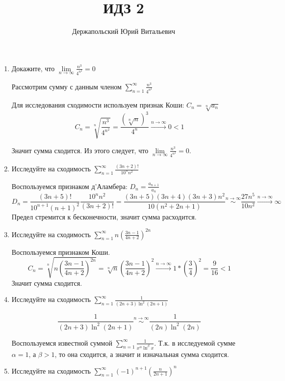 \documentclass[10pt]{article} %
\title{ИДЗ 2}
\author{Держапольский Юрий Витальевич}
\date{} %
\begin{document}
 \begin{large}  
\maketitle


\begin{enumerate}
 \item Докажите, что $ \lim\limits_{n\to\infty}{\frac{n^3}{4^{n^2}}} = 0 $

Рассмотрим сумму с данным членом $ \sum\limits_{n=1}^{\infty}{\frac{n^3}{4^{n^2}}}$

Для исследования сходимости используем признак Коши: $ C_{n} = \sqrt[n]{a_{n}}  $
\[ C_{n} = \sqrt[n]{\frac{n^3}{4^{n^2}}} = \frac{ (\sqrt[n]n)^3}{4^n} \xrightarrow{n\to\infty} 0 < 1 \]

Значит сумма сходится. Из этого следует, что $ \lim\limits_{n\to\infty}{\frac{n^3}{4^{n^2}}} = 0 $.

\item Исследуйте на сходимость $ \sum\limits_{n=1}^{\infty}{\frac{(3n+2)!}{10^n n^2}}$

Воспользуемся признаком д'Аламбера: $ D_{n} = \frac{a_{n+1}}{a_{n}}  $
\[  D_{n} =  \frac{(3n+5)!}{10^{n+1} (n+1)^2} \frac{10^n n^2}{(3n+2)!} = \frac{(3n+5)(3n+4)(3n+3)n^2}{10(n^2 + 2n+1) } \stackrel{n\to\infty}{\sim} 
\frac{27 n^5}{10 n^2 } \xrightarrow{n\to\infty} \infty \]
Предел стремится к бесконечности, значит сумма расходится.

\item Исследуйте на сходимость $ \sum\limits_{n=1}^{\infty}{n \left( \frac{3n-1}{4n+2} \right)^{2n} }$

Воспользуемся признаком Коши.
\[ C_{n} = \sqrt[n]{n \left( \frac{3n-1}{4n+2} \right)^{2n}} = \sqrt[n]{n}  \left( \frac{3n-1}{4n+2} \right)^2  \xrightarrow{n\to\infty} 1 * \left( \frac{3}{4}\right)^2 = \frac{9}{16} < 1 \]
Значит сумма сходится.

\item Исследуйте на сходимость $ \sum\limits_{n=1}^{\infty}{ \frac{1}{(2n+3)\ln^2{(2n+1)}} }$

\[   \frac{1}{(2n+3)\ln^2{(2n+1)}} \stackrel{n\to\infty}{\sim}  \frac{1}{(2n)\ln^2{(2n)}} \]

Воспользуемся известной суммой $  \sum\limits_{n=1}^{\infty}{ \frac{1}{x^\alpha\ln^\beta{x}} }  $. Т.к. в исследуемой сумме $\alpha = 1$, а $\beta > 1$, то она сходится, а значит и изначальная сумма сходится.

\item  Исследуйте на сходимость $ \sum\limits_{n=1}^{\infty}{ (-1)^{n+1} \left( \frac{n}{2n+1} \right)^{n} }$


\end{enumerate}
\end{large}
\end{document}

